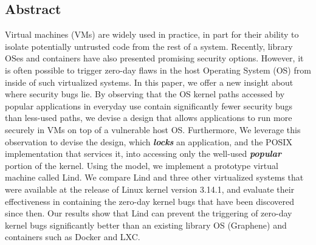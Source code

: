 \subsection*{Abstract}

Virtual machines (VMs) are widely used in practice, in part for their ability to
isolate potentially untrusted code from the rest of a system.
Recently, library OSes and containers have also presented promising security options.
%
However, it is often possible to trigger zero-day flaws
in the host Operating System (OS) from inside of such virtualized systems.
%
In this paper, we offer a new insight about where security bugs lie. By observing that the OS kernel paths accessed
by popular applications in everyday use contain significantly fewer security bugs than less-used paths, 
we devise a design that allows applications to run more securely in VMs on top of a vulnerable host OS.
Furthermore, We
leverage this observation to devise the \lip design, which
\textbf{\textit{locks}} an application, and the POSIX implementation that services it, into
accessing only the well-used \textbf{\textit{popular}} portion of the kernel.  Using the \lip model, we
implement a prototype virtual machine called Lind.
%
We compare Lind and three other virtualized systems that were
available at the release of Linux kernel version 3.14.1, and evaluate
their effectiveness in containing the zero-day kernel bugs that have been discovered
since then.
%
Our results show that Lind can prevent the triggering of zero-day kernel bugs significantly better
than an existing library OS (Graphene) and containers such as Docker and LXC.